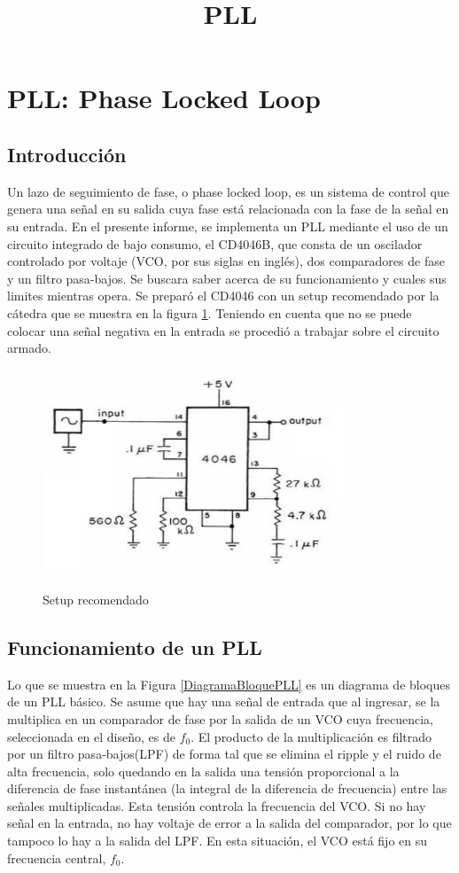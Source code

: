 \documentclass[10pt,a4paper]{article}
\title{PLL}
\begin{document}
\section{PLL: Phase Locked Loop}

\subsection{Introducción}

Un lazo de seguimiento de fase, o phase locked loop, es un sistema de control que genera una señal en su salida cuya fase está relacionada con la fase de la señal en su entrada. En el presente informe, se implementa un PLL mediante el uso de un circuito integrado de bajo consumo, el CD4046B, que consta de un oscilador controlado por voltaje (VCO, por sus siglas en inglés), dos comparadores de fase y un filtro pasa-bajos. Se buscara saber acerca de su funcionamiento y cuales sus limites mientras opera. 
Se preparó el CD4046 con un setup recomendado por la cátedra que se muestra en la figura \ref{fig:Circuito PLL}. Teniendo en cuenta que no se puede colocar una señal negativa en la entrada se procedió a trabajar sobre el circuito armado.

\begin{figure}[h!]
	\centering
	\includegraphics[width= 0.8\textwidth]{../1. PLL/Imagenes/Circuito PLL.png} 
	\label{fig:Circuito PLL}
	\caption{Setup recomendado}
\end{figure}

\subsection{Funcionamiento de un PLL}

Lo que se muestra en la Figura \ref{DiagramaBloquePLL} es un diagrama de bloques de un PLL básico. Se asume que hay una señal de entrada que al ingresar, se la multiplica en un comparador de fase por la salida de un VCO cuya frecuencia, seleccionada en el diseño, es de $f_0$. El producto de la multiplicación es filtrado por un filtro pasa-bajos(LPF) de forma tal que se elimina el ripple y el ruido de alta frecuencia, solo quedando en la salida una tensión proporcional a la diferencia de fase instantánea (la integral de la diferencia de frecuencia) entre las señales multiplicadas. Esta tensión controla la frecuencia del VCO. Si no hay señal en la entrada, no hay voltaje de error a la salida del comparador, por lo que tampoco lo hay a la salida del LPF. En esta situación, el VCO está fijo en su frecuencia central, $f_0$.
\end{document}

